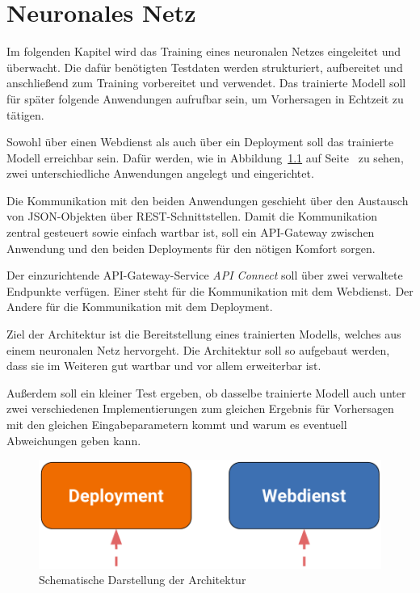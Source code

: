 \chapter{Neuronales Netz}
\label{ch:neuronalesNetz}
Im folgenden Kapitel wird das Training eines neuronalen Netzes eingeleitet und überwacht. Die dafür benötigten Testdaten
werden strukturiert, aufbereitet und anschließend zum Training vorbereitet und verwendet. Das trainierte Modell soll für
später folgende Anwendungen aufrufbar sein, um Vorhersagen in Echtzeit zu tätigen.

Sowohl über einen Webdienst als auch über ein Deployment soll das trainierte Modell erreichbar sein. Dafür werden, wie
in Abbildung~\ref{fig:schematische_architektur} auf Seite~\pageref{fig:schematische_architektur} zu sehen, zwei
unterschiedliche Anwendungen angelegt und eingerichtet.

Die Kommunikation mit den beiden Anwendungen geschieht über den Austausch von JSON-Objekten über REST-Schnittstellen.
Damit die Kommunikation zentral gesteuert sowie einfach wartbar ist, soll ein API-Gateway zwischen Anwendung und den
beiden Deployments für den nötigen Komfort sorgen.

Der einzurichtende API-Gateway-Service \textit{API Connect} soll über zwei verwaltete Endpunkte verfügen. Einer steht
für die Kommunikation mit dem Webdienst. Der Andere für die Kommunikation mit dem Deployment.

Ziel der Architektur ist die Bereitstellung eines trainierten Modells, welches aus einem neuronalen Netz hervorgeht. Die
Architektur soll so aufgebaut werden, dass sie im Weiteren gut wartbar und vor allem erweiterbar ist.

Außerdem soll ein kleiner Test ergeben, ob dasselbe trainierte Modell auch unter zwei verschiedenen Implementierungen
zum gleichen Ergebnis für Vorhersagen mit den gleichen Eingabeparametern kommt und warum es eventuell Abweichungen geben
kann.

\begin{figure}[h]
    \centering
    \includegraphics[scale=0.5]{images/kapitel_3/architektur_schematisch.pdf}
    \caption{Schematische Darstellung der Architektur}
    \label{fig:schematische_architektur}
\end{figure}
